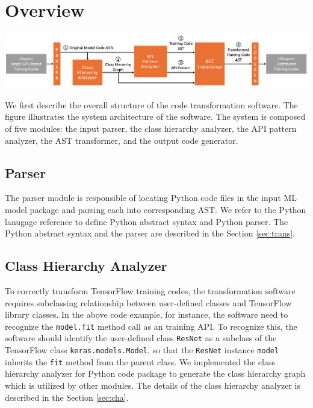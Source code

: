 \section{Overview}

\includegraphics[width=1\textwidth]{system_arch}

We first describe the overall structure of the code transformation software.
The figure illustrates the system architecture of the software.
The system is composed of five modules: the input parser,
the class hierarchy analyzer, the API pattern analyzer,
the AST transformer, and the output code generator.

\subsection{Parser}

The parser module is responsible of locating Python code files in the
input ML model package and parsing each into corresponding AST.
We refer to the Python lanugage reference\cite{pythonref}
to define Python abstract syntax and Python parser.
The Python abstract syntax and the parser 
are described in the Section \ref{sec:trans}.

\subsection{Class Hierarchy Analyzer}


\vspace{-3em}
\begin{figure}[h]
  
\end{figure}
\vspace{-3em}

To correctly transform TensorFlow training codes,
the transformation software requires subclassing relationship
between user-defined classes and TensorFlow library classes.
In the above code example, for instance, the software need to recognize
the {\tt model.fit} method call as an training API.
To recognize this, the software should identify the user-defined class
{\tt ResNet} as a subclass of the TensorFlow class {\tt keras.models.Model},
so that the {\tt ResNet} instance {\tt model} inherits the {\tt fit}
method from the parent class. 
We implemented the class hierarchy analyzer for Python code package
to generate the class hierarchy graph which is utilized by
other modules. The details of the class hierarchy analyzer is
described in the Section \ref{sec:cha}.

